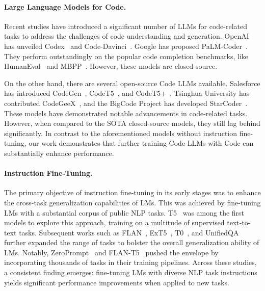 \paragraph{Large Language Models for Code.} Recent studies have introduced a significant number of LLMs for code-related tasks to address the challenges of code understanding and generation. OpenAI has unveiled Codex~\cite{codex} and Code-Davinci~\cite{Azure}. Google has proposed PaLM-Coder~\cite{PaLM}. They perform outstandingly on the popular code completion benchmarks, like HumanEval~\cite{humeval} and MBPP~\cite{MBPP}. However, these models are closed-source. 

On the other hand, there are several open-source Code LLMs available. Salesforce has introduced CodeGen~\cite{codegen}, CodeT5~\cite{codet5}, and CodeT5+~\cite{CodeT5+}. Tsinghua University has contributed CodeGeeX~\cite{CodeGeeX}, and the BigCode Project has developed StarCoder~\cite{li2023starcoder}. These models have demonstrated notable advancements in code-related tasks. However, when compared to the SOTA closed-source models, they still lag behind significantly. In contrast to the aforementioned models without instruction fine-tuning, our work demonstrates that further training Code LLMs with Code \name{} can substantially enhance performance.

\paragraph{Instruction Fine-Tuning.} 

The primary objective of instruction fine-tuning in its early stages was to enhance the cross-task generalization capabilities of LMs. This was achieved by fine-tuning LMs with a substantial corpus of public NLP tasks. T5~\cite{t5} was among the first models to explore this approach, training on a multitude of supervised text-to-text tasks. Subsequent works such as FLAN~\cite{DBLP:conf/iclr/WeiBZGYLDDL22}, ExT5~\cite{ExT5}, T0~\cite{T0}, and UnifiedQA~\cite{UnifiedQA} further expanded the range of tasks to bolster the overall generalization ability of LMs. Notably, ZeroPrompt~\cite{ZeroPrompt} and FLAN-T5~\cite{flan-t5} pushed the envelope by incorporating thousands of tasks in their training pipelines. Across these studies, a consistent finding emerges: fine-tuning LMs with diverse NLP task instructions yields significant performance improvements when applied to new tasks.

